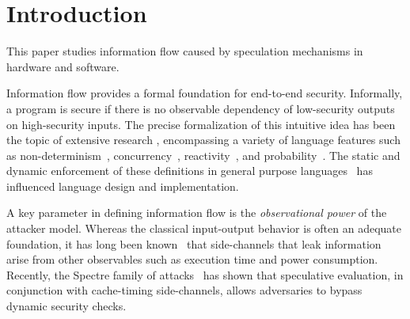 \section{Introduction}

This paper studies information flow caused by speculation mechanisms
in hardware and software.

Information flow provides a formal
foundation for end-to-end security.  Informally, a program is secure
if there is no observable dependency of low-security outputs on high-security inputs.
The precise formalization of this intuitive idea has been the topic of
extensive research \cite{Sabelfeld:2006:LIS:2312191.2314769}, encompassing a variety of language
features such as non-determinism~\cite{Wittbold1990InformationFI},
concurrency~\cite{Smith:1998:SIF:268946.268975}, reactivity~\cite{O'Neill:2006:ISI:1155442.1155677}, and
probability~\cite{Gray:1992:TMF:2699806.2699811}. The static and dynamic enforcement
of these definitions in general purpose languages~\cite{myers-popl99} has %
influenced language design and implementation.

A key parameter in defining information flow is the \emph{observational power} of the attacker model. Whereas the classical
input-output behavior is often an adequate foundation,
it has long been known~\cite{Lampson:1973:NCP:362375.362389,Biswas:2017:STC:3058791.3023872} that side-channels that leak
information arise from other observables such as execution time and
power consumption.
Recently, the Spectre family of attacks~\cite{DBLP:journals/corr/abs-1801-01203} has
shown that speculative evaluation, in conjunction with cache-timing side-channels,
allows adversaries to bypass dynamic security checks.

